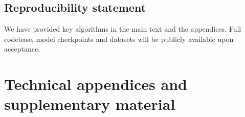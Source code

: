 \ifdefined\arxivbuild\else\documentclass{article}\fi %
\begin{document}
\subsection*{Reproducibility statement}
We have provided key algorithms in the main text and the appendices. Full codebase, model checkpoints and datasets will be publicly available upon acceptance.

{
\small


}


\appendix

\clearpage
\section*{Technical appendices and supplementary material}


\end{document}
